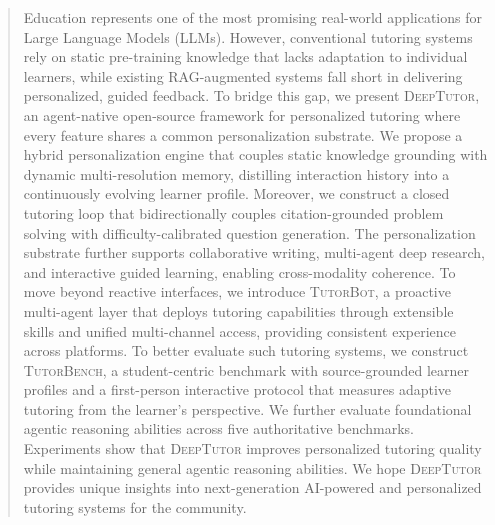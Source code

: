 \documentclass{article}
\begin{document}
\begin{abstract}
Education represents one of the most promising real-world applications for Large Language Models (LLMs). However, conventional tutoring systems rely on static pre-training knowledge that lacks adaptation to individual learners, while existing RAG-augmented systems fall short in delivering personalized, guided feedback. To bridge this gap, we present \textsc{DeepTutor}, an agent-native open-source framework for personalized tutoring where every feature shares a common personalization substrate. We propose a hybrid personalization engine that couples static knowledge grounding with dynamic multi-resolution memory, distilling interaction history into a continuously evolving learner profile. Moreover, we construct a closed tutoring loop that bidirectionally couples citation-grounded problem solving with difficulty-calibrated question generation. The personalization substrate further supports collaborative writing, multi-agent deep research, and interactive guided learning, enabling cross-modality coherence. To move beyond reactive interfaces, we introduce \textsc{TutorBot}, a proactive multi-agent layer that deploys tutoring capabilities through extensible skills and unified multi-channel access, providing consistent experience across platforms. To better evaluate such tutoring systems, we construct \textsc{TutorBench}, a student-centric benchmark with source-grounded learner profiles and a first-person interactive protocol that measures adaptive tutoring from the learner's perspective. We further evaluate foundational agentic reasoning abilities across five authoritative benchmarks. Experiments show that \textsc{DeepTutor} improves personalized tutoring quality while maintaining general agentic reasoning abilities. We hope \textsc{DeepTutor} provides unique insights into next-generation AI-powered and personalized tutoring systems for the community.
\end{abstract}












\appendix

\end{document}
